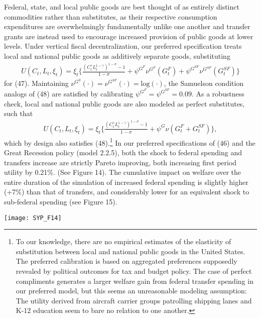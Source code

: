 \documentclass[12pt,letterpaper]{article}
\begin{document}
Federal, state, and local public goods are best thought of as entirely distinct commodities rather than substitutes, as their respective consumption expenditures are overwhelmingly fundamentally unlike one another and transfer grants are instead used to encourage increased provision of public goods at lower levels. Under vertical fiscal decentralization, our preferred specification treats local and national public goods as additively separate goods, substituting
\begin{align}
U(C_t,L_t,\xi_t) =  \xi_t \Big\{ \frac{(C_t^\gamma L_t^{1-\gamma})^{1-\sigma} - 1}{1 - \sigma} + \psi^{G^F} \nu^{G^F} (G^F_t) + \psi^{G^{SF}} \nu^{G^{SF}} (G^{SF}_t) \Big\}
\end{align}
for (47). Maintaining $\nu^{G^S} (\cdotp)  = \nu^{G^{SF}} (\cdotp) = \text{log}(\cdotp)$, the Samuelson condition analogs of (48) are satisfied by calibrating $ \psi^{G^{F}} = \psi^{G^{SF}} = 0.09$.
As a robustness check, local and national public goods are also modeled as perfect substitutes, such that
\begin{align}
U(C_t,L_t,\xi_t) =  \xi_t \Big\{  \frac{(C_t^\gamma L_t^{1-\gamma})^{1-\sigma} - 1}{1 - \sigma} + \psi^G \nu (G^F_t + G^{SF}_t) \Big\},
\end{align}
which by design also satisfies (48).\footnote{To our knowledge, there are no empirical estimates of the elasticity of substitution between local and national public goods in the United States. The preferred calibration is based on aggregated preferences supposedly revealed by political outcomes for tax and budget policy. The case of perfect compliments generates a larger welfare gain from federal transfer spending in our preferred model, but this seems an unreasonable modeling assumption: The utility derived from aircraft carrier groups patrolling shipping lanes and K-12 education seem to bare no relation to one another.} In our preferred specifications of (46) and the Great Recession policy (model 2.2.5), both the shock to federal spending and transfers increase are strictly Pareto improving, both increasing first period utility by 0.21\%. (See Figure 14). The cumulative impact on welfare over the entire duration of the simulation of increased federal spending is slightly higher (+7\%) than that of transfers, and considerably lower for an equivalent shock to sub-federal spending (see Figure 15). 

\begin{center}
\texttt{[image: SYP\_F14]}
\end{center}
\end{document}
